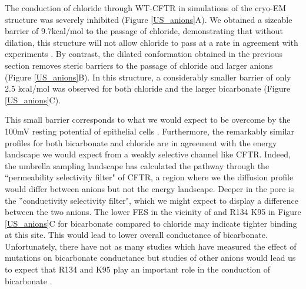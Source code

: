 The conduction of chloride through WT-CFTR in simulations of the cryo-EM structure was severely inhibited (Figure \ref{US_anions}A). We obtained a sizeable barrier of 9.7kcal/mol to the passage of chloride, demonstrating that without dilation, this structure will not allow chloride to pass at a rate in agreement with experiments \cite{}. By contrast, the dilated conformation obtained in the previous section removes steric barriers to the passage of chloride and larger anions (Figure \ref{US_anions}B). In this structure, a considerably smaller barrier of only 2.5 kcal/mol was observed for both chloride and the larger bicarbonate (Figure \ref{US_anions}C). 

This small barrier corresponds to what we would expect to be overcome by the 100mV resting potential of epithelial cells \cite{}. Furthermore, the remarkably similar profiles for both bicarbonate and chloride are in agreement with the energy landscape we would expect from a weakly selective channel like CFTR. Indeed, the umbrella sampling landscape has calculated the pathway through the ``permeability selectivity filter" of CFTR, a region where we the diffusion profile would differ between anions but not the energy landscape. Deeper in the pore is the ''conductivity selectivity filter", which we might expect to display a difference between the two anions. The lower FES in the vicinity of and R134 K95 in Figure \ref{US_anions}C for bicarbonate compared to chloride may indicate tighter binding at this site. This would lead to lower overall conductance of bicarbonate. Unfortunately, there have not as many studies which have measured the effect of mutations on bicarbonate conductance but studies of other anions would lead us to expect that R134 and K95 play an important role in the conduction of bicarbonate \cite{}. 

